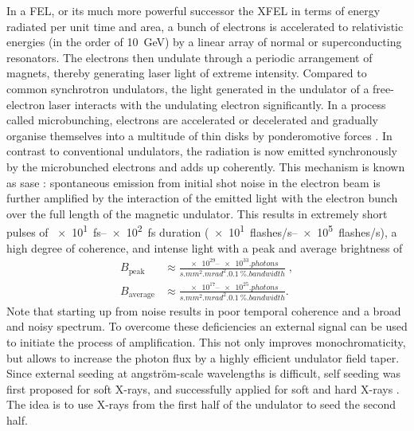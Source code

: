 \documentclass[
twoside,
openright,
titlepage,
numbers=noenddot,
headinclude,
fleqn,
a4paper,
footinclude=true,
cleardoublepage=empty,
abstractoff,
BCOR=5mm,
paper=a4,
fontsize=11pt,
british,ngerman,american,
]{scrreprt}
\begin{document}
In a \acf{FEL}, or its much more powerful successor the \ac{XFEL} in
terms of energy radiated per unit time and area, a bunch of electrons
is accelerated to relativistic energies (in the order of \SI{10}{GeV})
by a linear array of normal or superconducting resonators.  The
electrons then undulate through a periodic arrangement of magnets,
thereby generating laser light of extreme
intensity. %
Compared to common synchrotron undulators, the light generated in the
undulator of a free-electron laser interacts with the undulating
electron significantly.  In a process called microbunching, electrons
are accelerated or decelerated and gradually organise themselves into
a multitude of thin disks by ponderomotive forces \cite{Krapchev1979}.
In contrast to conventional undulators, the radiation is now emitted
synchronously by the microbunched electrons and adds up coherently.
This mechanism is known as \ac{sase} \cite{Andruszkow2000}:
spontaneous emission from initial shot noise in the electron beam is
further amplified by the interaction of the emitted light with the
electron bunch over the full length of the magnetic undulator.  This
results in extremely short pulses of \SIrange{e1}{e2}{fs} duration
(\SIrange{e1}{e5}{flashes/s}), a high degree of coherence, and intense
light with a peak and average brightness of
\begin{equation}
  \label{eq:fel-brightness}
  \begin{split}
    B_{\mathrm{peak}} & \approx 
    \frac{\numrange{e29}{e33}\si{.photons}}
    {\si{s.mm^2.mrad^2.}\SI{0.1}{\percent.bandwidth}} \;,
    \\ B_{\mathrm{average}} &\approx 
    \frac{\numrange{e17}{e25}\si{.photons}}
    {\si{s.mm^2.mrad^2.}\SI{0.1}{\percent.bandwidth}}.
  \end{split}%
\end{equation}
Note that starting up from noise results in poor temporal coherence
and a broad and noisy spectrum.  To overcome these deficiencies an
external signal can be used to initiate the process of amplification.
This not only improves monochromaticity, but allows to increase the
photon flux by a highly efficient undulator field taper.  Since
external seeding at angström-scale wavelengths is difficult, self
seeding was first proposed for soft X-rays, and successfully applied
for soft and hard X-rays \cite{Amann2012}.  The idea is to use X-rays
from the first half of the undulator to seed the second half.
\end{document}
